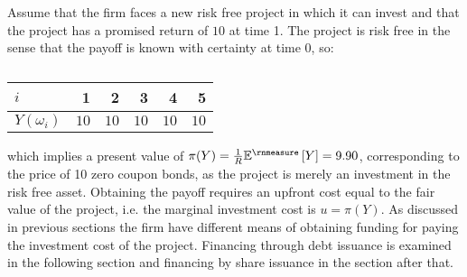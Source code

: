 \documentclass[main.tex]{subfiles}
\begin{document}
    Assume that the firm faces a new risk free project in which it can invest
    and that the project has a promised return of $10$ at time 1.
    The project is risk free in the sense that the payoff is known with certainty at time 0, so:
        \begin{table}[H]
            \centering
            \begin{tabular}{l|rrrrr}
                $i$ & 1 & 2 & 3 & 4 & 5 \\
                \hline
                $Y(\omega_{i})$ & $10$ & $10$ & $10$ & $10$ & $10$
            \end{tabular}
            \caption{}
        \end{table}
    which implies a present value of $\pi(Y) = \discountfactor \mathbb{E}^{\rnmeasure}\left[Y\right] = 9.90$, 
    corresponding to the price of 10 zero coupon bonds, as the project is merely an investment in the risk free asset.
    Obtaining the payoff requires an upfront cost equal to the fair value of the project, 
    i.e. the marginal investment cost is $u = \pi(Y)$.
    As discussed in previous sections the firm have different means of obtaining funding
    for paying the investment cost of the project.
    Financing through debt issuance is examined in the following section 
    and financing by share issuance in the section after that.
\end{document}
